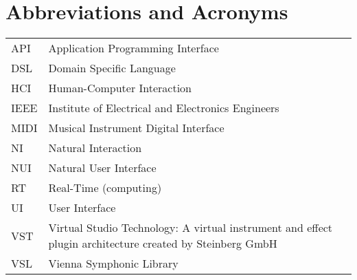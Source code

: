 \chapter*{Abbreviations and Acronyms}


\noindent
\begin{longtable}{@{}p{}p{}@{}}
API & Application Programming Interface \\
DSL & Domain Specific Language \\
HCI & Human-Computer Interaction \\
IEEE & Institute of Electrical and Electronics Engineers \\
MIDI & Musical Instrument Digital Interface \\
NI & Natural Interaction \\
NUI & Natural User Interface \\
RT & Real-Time (computing) \\
UI & User Interface \\
VST & Virtual Studio Technology: A virtual instrument and effect plugin architecture created by Steinberg GmbH \\
VSL & Vienna Symphonic Library

\end{longtable}
